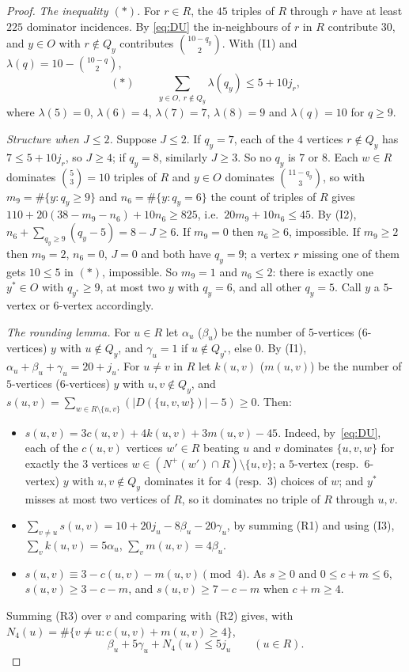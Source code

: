 \documentclass[11pt]{amsart}
\theoremstyle{definition}
\theoremstyle{remark}
\newcommand{\D}{D}
\newcommand{\Nout}{N^{+}}
\newcommand{\abs}[1]{\lvert #1\rvert}
\begin{document}
\begin{proof}
\emph{The inequality $(\ast)$.} For $r\in R$, the $45$ triples of $R$ through $r$ have at least $225$ dominator incidences. By
\eqref{eq:DU} the in-neighbours of $r$ in $R$ contribute $30$, and $y\in O$ with $r\notin Q_y$ contributes $\binom{10-q_y}2$. With
(I1) and $\lambda(q)=10-\binom{10-q}2$,
\[
  (\ast)\qquad \sum_{y\in O,\ r\notin Q_y}\lambda(q_y)\le5+10j_r,
\]
where $\lambda(5)=0$, $\lambda(6)=4$, $\lambda(7)=7$, $\lambda(8)=9$ and $\lambda(q)=10$ for $q\ge9$.

\emph{Structure when $J\le2$.} Suppose $J\le2$. If $q_y=7$, each of the $4$ vertices $r\notin Q_y$ has $7\le5+10j_r$, so $J\ge4$; if
$q_y=8$, similarly $J\ge3$. So no $q_y$ is $7$ or $8$. Each $w\in R$ dominates $\binom53=10$ triples of $R$ and $y\in O$ dominates
$\binom{11-q_y}3$, so with $m_9=\#\{y:q_y\ge9\}$ and $n_6=\#\{y:q_y=6\}$ the count of triples of $R$ gives
$110+20(38-m_9-n_6)+10n_6\ge825$, i.e.\ $20m_9+10n_6\le45$. By (I2), $n_6+\sum_{q_y\ge9}(q_y-5)=8-J\ge6$. If $m_9=0$ then
$n_6\ge6$, impossible. If $m_9\ge2$ then $m_9=2$, $n_6=0$, $J=0$ and both have $q_y=9$; a vertex $r$ missing one of them gets
$10\le5$ in $(\ast)$, impossible. So $m_9=1$ and $n_6\le2$: there is exactly one $y^*\in O$ with $q_{y^*}\ge9$, at most two $y$ with
$q_y=6$, and all other $q_y=5$. Call $y$ a $5$-vertex or $6$-vertex accordingly.

\emph{The rounding lemma.} For $u\in R$ let $\alpha_u$ ($\beta_u$) be the number of $5$-vertices ($6$-vertices) $y$ with $u\notin Q_y$,
and $\gamma_u=1$ if $u\notin Q_{y^*}$, else $0$. By (I1), $\alpha_u+\beta_u+\gamma_u=20+j_u$. For $u\ne v$ in $R$ let $k(u,v)$
($m(u,v)$) be the number of $5$-vertices ($6$-vertices) $y$ with $u,v\notin Q_y$, and
$s(u,v)=\sum_{w\in R\setminus\{u,v\}}(\abs{\D(\{u,v,w\})}-5)\ge0$. Then:
\begin{itemize}
\item[(R1)] $s(u,v)=3c(u,v)+4k(u,v)+3m(u,v)-45$. Indeed, by~\eqref{eq:DU}, each of the $c(u,v)$ vertices $w'\in R$ beating $u$ and
$v$ dominates $\{u,v,w\}$ for exactly the $3$ vertices $w\in(\Nout(w')\cap R)\setminus\{u,v\}$; a $5$-vertex (resp.\ $6$-vertex) $y$
with $u,v\notin Q_y$ dominates it for $4$ (resp.\ $3$) choices of $w$; and $y^*$ misses at most two vertices of $R$, so it dominates
no triple of $R$ through $u,v$.
\item[(R2)] $\sum_{v\ne u}s(u,v)=10+20j_u-8\beta_u-20\gamma_u$, by summing (R1) and using (I3), $\sum_vk(u,v)=5\alpha_u$,
$\sum_vm(u,v)=4\beta_u$.
\item[(R3)] $s(u,v)\equiv3-c(u,v)-m(u,v)\pmod4$. As $s\ge0$ and $0\le c+m\le6$, $s(u,v)\ge3-c-m$, and $s(u,v)\ge7-c-m$ when
$c+m\ge4$.
\end{itemize}
Summing (R3) over $v$ and comparing with (R2) gives, with $N_4(u)=\#\{v\ne u: c(u,v)+m(u,v)\ge4\}$,
\[
  \beta_u+5\gamma_u+N_4(u)\le5j_u\qquad(u\in R).
\]


\end{proof}
\end{document}
